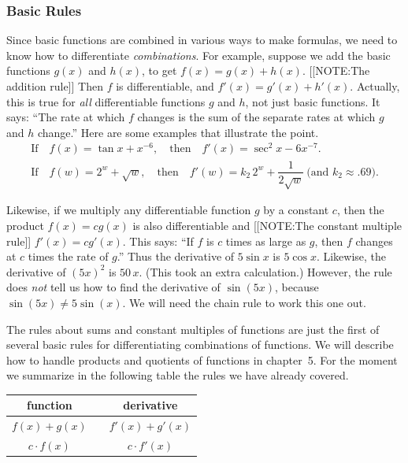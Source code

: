 \subsubsection{Basic Rules}
\label{subsubsec:basic-rules}

Since basic functions are combined in various ways to make formulas,
we need to know how to differentiate {\em combinations\/}.  For
example, suppose we add the basic functions $g(x)$ and $h(x)$, to get
$f(x) = g(x) + h(x)$.
[[NOTE:The addition rule]]
Then $f$ is differentiable, and $f'(x) = g'(x) + h'(x)$.  Actually,
this is true for {\em all\/} differentiable functions $g$ and $h$, not
just basic functions.  It says: ``The rate at which $f$ changes is the
sum of the separate rates at which $g$ and $h$ change.''  Here are
some examples that illustrate the point.
\begin{gather*}
\mbox{If} \quad f(x) = \tan{x} + x^{-6}, \quad 
		\mbox{then} \quad f'(x) = 
		{\displaystyle \sec^2{x} - 6x^{-7}}. \\
\mbox{If} \quad f(w) =  2^w + \sqrt{w}, \quad 
		\mbox{then} \quad f'(w) = k_2\,  2^w + 
		\dfrac{1}{2 \sqrt{w}} \ \mbox{(and $k_2 
		\approx .69$)}.
\end{gather*}


Likewise, if we multiply any differentiable function $g$ by a constant
$c$, then the product $f(x) = cg(x)$ is also differentiable and
[[NOTE:The constant multiple rule]]
$f'(x) = cg'(x)$.  This says: ``If $f$ is $c$ times as large as $g$,
then $f$ changes at $c$ times the rate of $g$.''  Thus the derivative
of $5\sin{x}$ is $5\cos{x}$.  Likewise, the derivative of $(5x)^2$ is
$50\,x$.  (This took an extra calculation.)  However, the rule does
{\em not\/} tell us how to find the derivative of
$\sin(5x)$\label{`sin(5x)'}, because $\sin(5x) \neq 5\sin(x)$.  We
will need the chain rule to work this one out.

The rules about sums and constant multiples of functions are just the
first of several basic rules for differentiating combinations of
functions.  We will describe how to handle products and quotients of
functions in chapter~5.  For the moment we summarize in the following
table the rules we have already covered.
\begin{center}
\begin{tabular}{ccc}
	function & \qquad & derivative \\[2pt] \hline
	$f(x)+g(x)$ & \rule{0pt}{16pt} & $f'(x)+g'(x)$ \\ [2pt]
	$c \cdot f(x)$ & & $c \cdot f'(x)$
\end{tabular}
\end{center}

